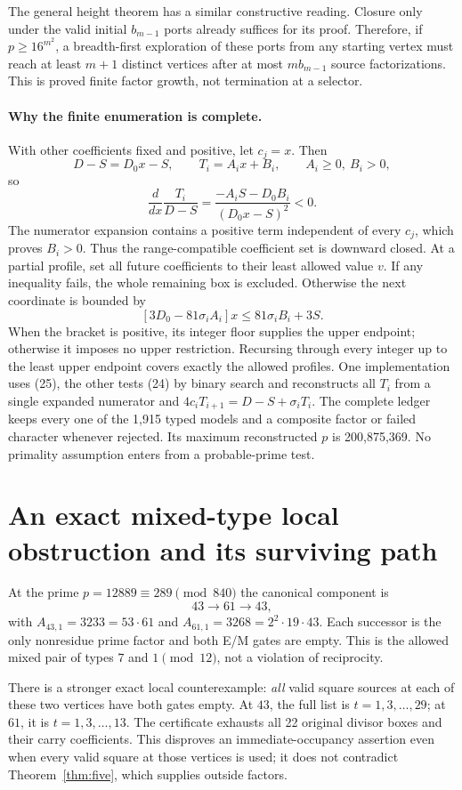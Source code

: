 The general height theorem has a similar constructive reading. Closure only under
the valid initial $b_{m-1}$ ports already suffices for its proof. Therefore, if
$p\ge16^{m^2}$, a breadth-first exploration of these ports from any starting vertex
must reach at least $m+1$ distinct vertices after at most $m b_{m-1}$ source
factorizations. This is proved finite factor growth, not termination at a selector.

\paragraph{Why the finite enumeration is complete.}
With other coefficients fixed and positive, let $c_j=x$. Then
\[
 D-S=D_0x-S,\qquad T_i=A_ix+B_i,\qquad A_i\ge0,\ B_i>0,
\]
so
\[
 \frac{d}{dx}\frac{T_i}{D-S}
 =\frac{-A_iS-D_0B_i}{(D_0x-S)^2}<0.                    \tag{24}
\]
The numerator expansion contains a positive term independent of every $c_j$,
which proves $B_i>0$. Thus the range-compatible coefficient set is downward
closed. At a partial profile, set all future coefficients to their least allowed
value $v$. If any inequality fails, the whole remaining box is excluded.
Otherwise the next coordinate is bounded by
\[
 [3D_0-81\sigma_iA_i]x\le81\sigma_iB_i+3S.              \tag{25}
\]
When the bracket is positive, its integer floor supplies the upper endpoint;
otherwise it imposes no upper restriction. Recursing through every integer up to
the least upper endpoint covers exactly the allowed profiles. One implementation
uses (25), the other tests (24) by binary search and reconstructs all $T_i$ from a
single expanded numerator and $4c_iT_{i+1}=D-S+\sigma_iT_i$.
The complete ledger keeps every one of the 1,915 typed models and a composite
factor or failed character whenever rejected. Its maximum reconstructed $p$ is
200,875,369. No primality assumption enters from a probable-prime test.

\section{An exact mixed-type local obstruction and its surviving path}
At the prime $p=12889\equiv289\pmod{840}$ the canonical component is
\[
 43\longrightarrow61\longrightarrow43,
\]
with $A_{43,1}=3233=53\cdot61$ and
$A_{61,1}=3268=2^2\cdot19\cdot43$. Each successor is the only nonresidue prime
factor and both E/M gates are empty. This is the allowed mixed pair of types
$7$ and $1\pmod{12}$, not a violation of reciprocity.

There is a stronger exact local counterexample: \emph{all} valid square sources
at each of these two vertices have both gates empty. At $43$, the full list is
$t=1,3,\ldots,29$; at $61$, it is $t=1,3,\ldots,13$. The certificate exhausts all
22 original divisor boxes and their carry coefficients. This disproves an
immediate-occupancy assertion even when every valid square at those vertices is
used; it does not contradict Theorem~\ref{thm:five}, which supplies outside factors.

